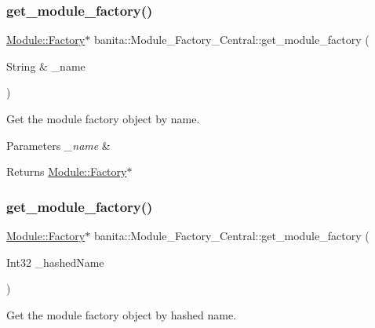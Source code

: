 \subsubsection{\texorpdfstring{get\_module\_factory()}{get\_module\_factory()}\hspace{0.1cm}{\footnotesize\ttfamily [1/2]}}
{\footnotesize\ttfamily \mbox{\hyperlink{classbanita_1_1_module_1_1_factory}{Module\+::\+Factory}}$\ast$ banita\+::\+Module\+\_\+\+Factory\+\_\+\+Central\+::get\+\_\+module\+\_\+factory (\begin{DoxyParamCaption}\item[{String \&}]{\+\_\+name }\end{DoxyParamCaption})\hspace{0.3cm}{\ttfamily [inline]}}



Get the module factory object by name. 


\begin{DoxyParams}{Parameters}
{\em \+\_\+name} & \\
\hline
\end{DoxyParams}
\begin{DoxyReturn}{Returns}
\mbox{\hyperlink{classbanita_1_1_module_1_1_factory}{Module\+::\+Factory}}$\ast$ 
\end{DoxyReturn}
\mbox{\label{classbanita_1_1_module___factory___central_a3b594f3e8a6ea6b2f4bf7c05c239c7c7}} 
\subsubsection{\texorpdfstring{get\_module\_factory()}{get\_module\_factory()}\hspace{0.1cm}{\footnotesize\ttfamily [2/2]}}
{\footnotesize\ttfamily \mbox{\hyperlink{classbanita_1_1_module_1_1_factory}{Module\+::\+Factory}}$\ast$ banita\+::\+Module\+\_\+\+Factory\+\_\+\+Central\+::get\+\_\+module\+\_\+factory (\begin{DoxyParamCaption}\item[{Int32}]{\+\_\+hashed\+Name }\end{DoxyParamCaption})}



Get the module factory object by hashed name. 



